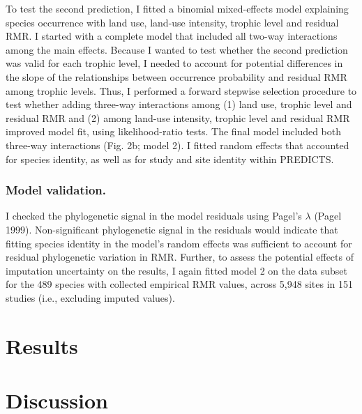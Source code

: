 To test the second prediction, I fitted a binomial mixed-effects model explaining species occurrence with land use, land-use intensity, trophic level and residual RMR. I started with a complete model that included all two-way interactions among the main effects. Because I wanted to test whether the second prediction was valid for each trophic level, I needed to account for potential differences in the slope of the relationships between occurrence probability and residual RMR among trophic levels. Thus, I performed a forward stepwise selection procedure to test whether adding three-way interactions among (1) land use, trophic level and residual RMR and (2) among land-use intensity, trophic level and residual RMR improved model fit, using likelihood-ratio tests. The final model included both three-way interactions (Fig. 2b; model 2). I fitted random effects that accounted for species identity, as well as for study and site identity within PREDICTS.  

\subsubsection*{Model validation.}
I checked the phylogenetic signal in the model residuals using Pagel’s $\lambda$ (Pagel 1999). Non-significant phylogenetic signal in the residuals would indicate that fitting species identity in the model’s random effects was sufficient to account for residual phylogenetic variation in RMR. Further, to assess the potential effects of imputation uncertainty on the results, I again fitted model 2 on the data subset for the 489 species with collected empirical RMR values, across 5,948 sites in 151 studies (i.e., excluding imputed values).  


\section{Results}

\section{Discussion}
